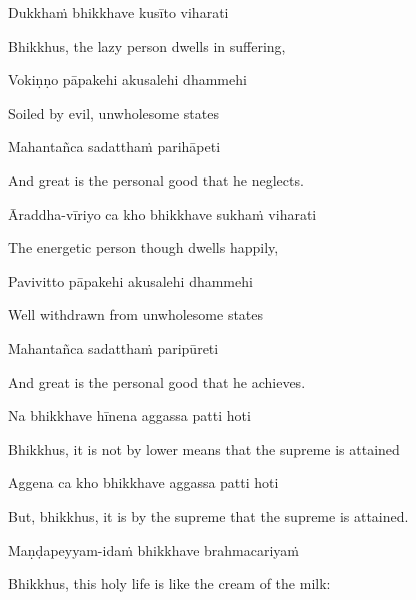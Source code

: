 
Dukkhaṁ bhikkhave kusīto viharati

\begin{english}
  Bhikkhus, the lazy person dwells in suffering,
\end{english}

Vokiṇṇo pāpakehi akusalehi dhammehi

\begin{english}
  Soiled by evil, unwholesome states
\end{english}

Mahantañca sadatthaṁ parihāpeti

\begin{english}
  And great is the personal good that he neglects.
\end{english}

Āraddha-vīriyo ca kho bhikkhave sukhaṁ viharati

\begin{english}
  The energetic person though dwells happily,
\end{english}

Pavivitto pāpakehi akusalehi dhammehi

\begin{english}
  Well withdrawn from unwholesome states
\end{english}

Mahantañca sadatthaṁ paripūreti

\begin{english}
  And great is the personal good that he achieves.
\end{english}

Na bhikkhave hīnena aggassa patti hoti

\begin{english}
  Bhikkhus, it is not by lower means that the supreme is attained
\end{english}

Aggena ca kho bhikkhave aggassa patti hoti

\begin{english}
  But, bhikkhus, it is by the supreme that the supreme is attained.
\end{english}

Maṇḍapeyyam-idaṁ bhikkhave brahmacariyaṁ

\begin{english}
  Bhikkhus, this holy life is like the cream of the milk:
\end{english}

